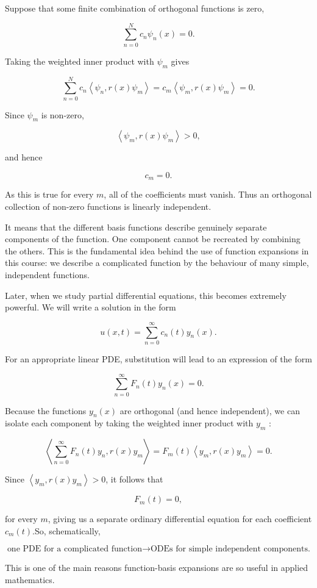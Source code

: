 \begin{formalproof}
Suppose that some finite combination of orthogonal functions is zero,

\[
\sum_{n=0}^N c_n \psi_n(x)=0 .
\]

Taking the weighted inner product with \(\psi_m\) gives

\[
\sum_{n=0}^N c_n\left\langle\psi_n, r(x) \psi_m\right\rangle=c_m\left\langle\psi_m, r(x) \psi_m\right\rangle=0 .
\]

Since \(\psi_m\) is non-zero,

\[
\left\langle\psi_m, r(x) \psi_m\right\rangle>0,
\]

and hence

\[
c_m=0 .
\]

As this is true for every \(m\), all of the coefficients must vanish. Thus an orthogonal collection of non-zero functions is linearly independent.
\end{formalproof}

\begin{remark}
  It means that the different basis functions describe genuinely separate components of the function. One component cannot be recreated by combining the others. This is the fundamental idea behind the use of function expansions in this course: we describe a complicated function by the behaviour of many simple, independent functions.
\end{remark}

\begin{proposition}
  Later, when we study partial differential equations, this becomes extremely powerful. We will write a solution in the form

\[
u(x, t)=\sum_{n=0}^{\infty} c_n(t) y_n(x) .
\]

For an appropriate linear PDE, substitution will lead to an expression of the form

\[
\sum_{n=0}^{\infty} F_n(t) y_n(x)=0 .
\]

Because the functions \(y_n(x)\) are orthogonal (and hence independent), we can isolate each component by taking the weighted inner product with \(y_m\) :

\[
\left\langle\sum_{n=0}^{\infty} F_n(t) y_n, r(x) y_m\right\rangle=F_m(t)\left\langle y_m, r(x) y_m\right\rangle=0 .
\]

Since \(\left\langle y_m, r(x) y_m\right\rangle>0\), it follows that

\[
F_m(t)=0,
\]

for every \(m\), giving us a separate ordinary differential equation for each coefficient \(c_m(t)\).So, schematically,

\[\text{one PDE for a complicated function} \rightarrow \text{ODEs for simple independent components.}\]

This is one of the main reasons function-basis expansions are so useful in applied mathematics.
\end{proposition}

